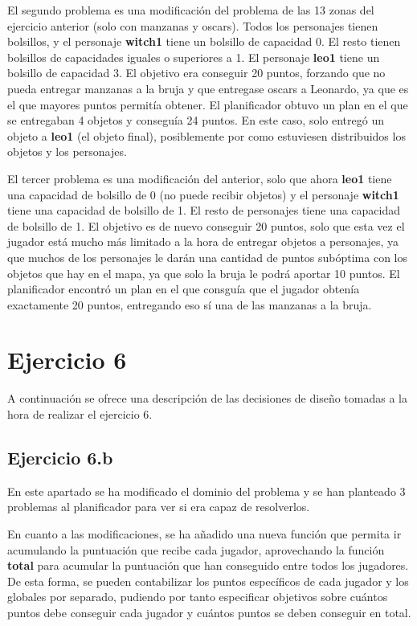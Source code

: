 \documentclass[11pt,a4paper]{article}
\begin{document}
El segundo problema es una modificación del problema de las 13 zonas del ejercicio anterior (solo con manzanas y oscars). Todos los
personajes tienen bolsillos, y el personaje \textbf{witch1} tiene un bolsillo de capacidad 0. El resto tienen bolsillos de capacidades
iguales o superiores a 1. El personaje \textbf{leo1} tiene un bolsillo de capacidad 3. El objetivo era conseguir 20 puntos, forzando
que no pueda entregar manzanas a la bruja y que entregase oscars a Leonardo, ya que es el que mayores puntos permitía obtener. El
planificador obtuvo un plan en el que se entregaban 4 objetos y conseguía 24 puntos. En este caso, solo entregó un objeto a
\textbf{leo1} (el objeto final), posiblemente por como estuviesen distribuidos los objetos y los personajes.

El tercer problema es una modificación del anterior, solo que ahora \textbf{leo1} tiene una capacidad de bolsillo de 0 (no puede
recibir objetos) y el personaje \textbf{witch1} tiene una capacidad de bolsillo de 1. El resto de personajes tiene una capacidad
de bolsillo de 1. El objetivo es de nuevo conseguir 20 puntos, solo que esta vez el jugador está mucho más limitado a la hora de
entregar objetos a personajes, ya que muchos de los personajes le darán una cantidad de puntos subóptima con los objetos que hay
en el mapa, ya que solo la bruja le podrá aportar 10 puntos. El planificador encontró un plan en el que consguía que el jugador
obtenía exactamente 20 puntos, entregando eso sí una de las manzanas a la bruja.


\section{Ejercicio 6}

A continuación se ofrece una descripción de las decisiones de diseño tomadas a la hora de realizar el ejercicio 6.

\subsection{Ejercicio 6.b}

En este apartado se ha modificado el dominio del problema y se han planteado 3 problemas al planificador para ver si era capaz de
resolverlos.

En cuanto a las modificaciones, se ha añadido una nueva función que permita ir acumulando la puntuación que recibe
cada jugador, aprovechando la función \textbf{total} para acumular la puntuación que han conseguido entre todos los jugadores. De
esta forma, se pueden contabilizar los puntos específicos de cada jugador y los globales por separado, pudiendo por tanto especificar
objetivos sobre cuántos puntos debe conseguir cada jugador y cuántos puntos se deben conseguir en total.
\end{document}

